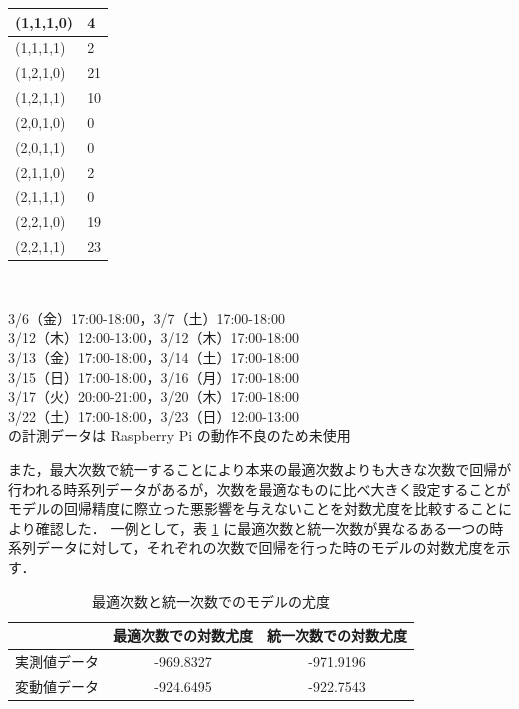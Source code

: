 \documentclass[technicalreport]{ieicej}
\begin{document}
\begin{table}[tb]
\begin{minipage}{.25\textwidth}
\begin{center}
\begin{tabular}{|l|l|}
(1,1,1,0) & 4\\
\hline
(1,1,1,1) & 2\\
\hline
(1,2,1,0) & 21\\
\hline
(1,2,1,1) & 10\\
\hline
(2,0,1,0) & 0\\
\hline
(2,0,1,1) & 0\\
\hline
(2,1,1,0) & 2\\
\hline
(2,1,1,1) & 0\\
\hline
(2,2,1,0) & 19\\
\hline
(2,2,1,1) & 23\\
\hline
\end{tabular}
\end{center}
\end{minipage}
\\
\begin{center}
3/6（金）17:00-18:00，3/7（土）17:00-18:00\\
3/12（木）12:00-13:00，3/12（木）17:00-18:00\\
3/13（金）17:00-18:00，3/14（土）17:00-18:00\\
3/15（日）17:00-18:00，3/16（月）17:00-18:00\\
3/17（火）20:00-21:00，3/20（木）17:00-18:00\\
3/22（土）17:00-18:00，3/23（日）12:00-13:00\\
の計測データは Raspberry Pi の動作不良のため未使用
\end{center}
\end{table}

また，最大次数で統一することにより本来の最適次数よりも大きな次数で回帰が行われる時系列データがあるが，次数を最適なものに比べ大きく設定することがモデルの回帰精度に際立った悪影響を与えないことを対数尤度を比較することにより確認した．
一例として，表 \ref{more-param} に最適次数と統一次数が異なるある一つの時系列データに対して，それぞれの次数で回帰を行った時のモデルの対数尤度を示す．


\begin{table}[tb]
\centering
\caption{最適次数と統一次数でのモデルの尤度}
\label{more-param}
\begin{tabular}{|l|c|c|}
\hline
&最適次数での対数尤度&統一次数での対数尤度\\
\hline
実測値データ&-969.8327&-971.9196\\
\hline
変動値データ&-924.6495&-922.7543\\
\hline
\end{tabular}
\end{table}
\end{document}
